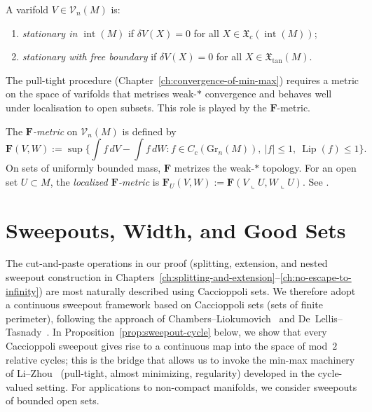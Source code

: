 \begin{definition}[Stationarity]\label{def:stationary}
A varifold $V \in \mathcal{V}_n(M)$ is:
\begin{enumerate}[label=\textup{(\roman*)}]
    \item \emph{stationary in $\operatorname{int}(M)$} if $\delta V(X) = 0$ for all $X \in \mathfrak{X}_c(\operatorname{int}(M))$;
    \item \emph{stationary with free boundary} if $\delta V(X) = 0$ for all $X \in \mathfrak{X}_{\mathrm{tan}}(M)$.
\end{enumerate}
\end{definition}

The pull-tight procedure (Chapter~\ref{ch:convergence-of-min-max}) requires a metric on the space of varifolds that metrises weak-$*$ convergence and behaves well under localisation to open subsets. This role is played by the $\mathbf{F}$-metric.

\begin{definition}\label{def:F-metric}
The \emph{$\mathbf{F}$-metric} on $\mathcal{V}_n(M)$ is defined by
\[
\mathbf{F}(V, W) := \sup\biggl\{\int f \, dV - \int f \, dW : f \in C_c(\mathrm{Gr}_n(M)),\ |f| \leq 1,\ \operatorname{Lip}(f) \leq 1\biggr\}.
\]
On sets of uniformly bounded mass, $\mathbf{F}$ metrizes the weak-$*$ topology. For an open set $U \subset M$, the \emph{localized $\mathbf{F}$-metric} is $\mathbf{F}_U(V, W) := \mathbf{F}(V \llcorner U, W \llcorner U)$. See \cite[Section~2]{LZ17}.
\end{definition}

\section{Sweepouts, Width, and Good Sets}\label{sec:sweepouts}

The cut-and-paste operations in our proof (splitting, extension, and nested sweepout construction in Chapters~\ref{ch:splitting-and-extension}--\ref{ch:no-escape-to-infinity}) are most naturally described using Caccioppoli sets. We therefore adopt a continuous sweepout framework based on Caccioppoli sets (sets of finite perimeter), following the approach of Chambers--Liokumovich~\cite{CL20} and De~Lellis--Tasnady~\cite{DLT13}. In Proposition~\ref{prop:sweepout-cycle} below, we show that every Caccioppoli sweepout gives rise to a continuous map into the space of mod~$2$ relative cycles; this is the bridge that allows us to invoke the min-max machinery of Li--Zhou~\cite{LZ17} (pull-tight, almost minimizing, regularity) developed in the cycle-valued setting. For applications to non-compact manifolds, we consider sweepouts of bounded open sets.

